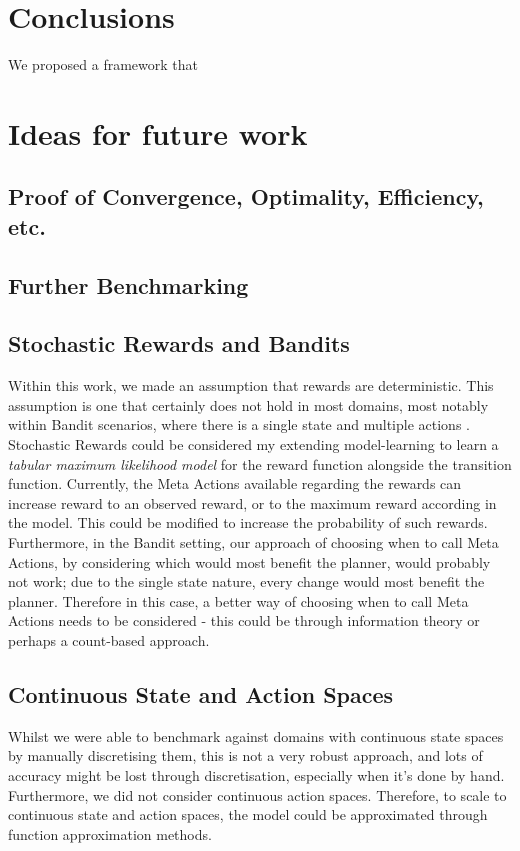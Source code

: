 \section{Conclusions}
We proposed a framework that 
\section{Ideas for future work}

\subsection{Proof of Convergence, Optimality, Efficiency, etc.}
\subsection{Further Benchmarking}
\subsection{Stochastic Rewards and Bandits}
Within this work, we made an assumption that rewards are deterministic. This assumption is one that certainly does not hold in most domains, most notably within Bandit scenarios, where there is a single state and multiple actions \citep{lattimore}. Stochastic Rewards could be considered my extending model-learning to learn a \textit{tabular maximum likelihood model} for the reward function alongside the transition function. Currently, the Meta Actions available regarding the rewards can increase reward to an observed reward, or to the maximum reward according in the model. This could be modified to increase the probability of such rewards. Furthermore, in the Bandit setting, our approach of choosing when to call Meta Actions, by considering which would most benefit the planner, would probably not work; due to the single state nature, every change would most benefit the planner. Therefore in this case, a better way of choosing when to call Meta Actions needs to be considered - this could be through information theory or perhaps a count-based approach.
\subsection{Continuous State and Action Spaces}
Whilst we were able to benchmark against domains with continuous state spaces by manually discretising them, this is not a very robust approach, and lots of accuracy might be lost through discretisation, especially when it's done by hand. Furthermore, we did not consider continuous action spaces. Therefore, to scale to continuous state and action spaces, the model could be approximated through function approximation methods.
